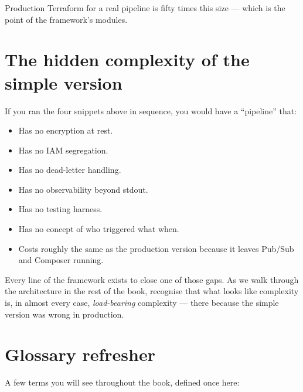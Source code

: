 \documentclass[
  11pt,
  british,
  oneside]{book}
\providecommand{\tightlist}{%
  \setlength{\itemsep}{0pt}\setlength{\parskip}{0pt}}
\begin{document}
Production Terraform for a real pipeline is fifty times this size ---
which is the point of the framework's modules.

\hypertarget{the-hidden-complexity-of-the-simple-version}{%
\section{The hidden complexity of the simple
version}\label{the-hidden-complexity-of-the-simple-version}}

If you ran the four snippets above in sequence, you would have a
``pipeline'' that:

\begin{itemize}
\tightlist
\item
  Has no encryption at rest.
\item
  Has no IAM segregation.
\item
  Has no dead-letter handling.
\item
  Has no observability beyond stdout.
\item
  Has no testing harness.
\item
  Has no concept of who triggered what when.
\item
  Costs roughly the same as the production version because it leaves
  Pub/Sub and Composer running.
\end{itemize}

Every line of the framework exists to close one of those gaps. As we
walk through the architecture in the rest of the book, recognise that
what looks like complexity is, in almost every case, \emph{load-bearing}
complexity --- there because the simple version was wrong in production.

\hypertarget{glossary-refresher}{%
\section{Glossary refresher}\label{glossary-refresher}}

A few terms you will see throughout the book, defined once here:
\end{document}
